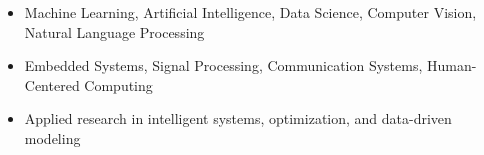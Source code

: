 \begin{itemize}
  \item Machine Learning, Artificial Intelligence, Data Science, Computer Vision, Natural Language Processing
  \item Embedded Systems, Signal Processing, Communication Systems, Human-Centered Computing
  \item Applied research in intelligent systems, optimization, and data-driven modeling
\end{itemize}
